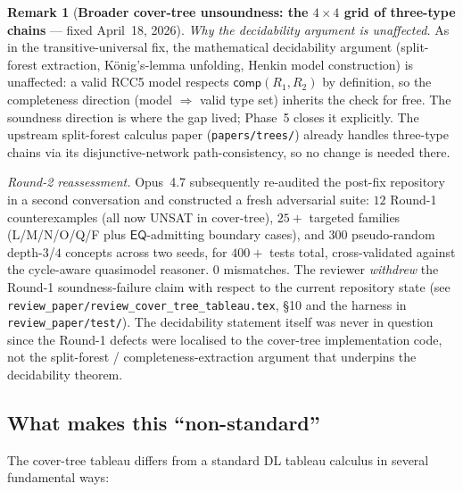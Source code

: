 \documentclass[
]{ceurart}
\theoremstyle{definition}
\newtheorem{remark}[theorem]{Remark}
\newcommand{\EQ}{\ensuremath{\mathsf{EQ}}}
\newcommand{\comp}{\ensuremath{\mathsf{comp}}}
\begin{document}
\begin{remark}[\textbf{Broader cover-tree unsoundness: the $4\times 4$ grid of three-type chains} --- fixed April~18, 2026]
\emph{Why the decidability argument is unaffected.} As in the
transitive-universal fix, the mathematical decidability argument
(split-forest extraction, König's-lemma unfolding, Henkin model
construction) is unaffected: a valid RCC5 model respects
$\comp(R_1, R_2)$ by definition, so the completeness direction
(model $\Rightarrow$ valid type set) inherits the check for free.
The soundness direction is where the gap lived; Phase~5 closes
it explicitly. The upstream split-forest calculus paper
(\texttt{papers/trees/}) already handles three-type chains via
its disjunctive-network path-consistency, so no change is needed
there.

\emph{Round-2 reassessment.} Opus~4.7 subsequently re-audited
the post-fix repository in a second conversation and constructed
a fresh adversarial suite: $12$ Round-1 counterexamples (all now
UNSAT in cover-tree), $25+$ targeted families (L/M/N/O/Q/F plus
$\EQ$-admitting boundary cases), and $300$ pseudo-random
depth-$3$/$4$ concepts across two seeds, for $400+$ tests total,
cross-validated against the cycle-aware quasimodel reasoner.
$0$ mismatches. The reviewer \emph{withdrew} the Round-1
soundness-failure claim with respect to the current repository
state (see \texttt{review\_paper/review\_cover\_tree\_tableau.tex},
§10 and the harness in \texttt{review\_paper/test/}). The
decidability statement itself was never in question since the
Round-1 defects were localised to the cover-tree implementation
code, not the split-forest / completeness-extraction argument that
underpins the decidability theorem.
\end{remark}

\subsection{What makes this ``non-standard''}

The cover-tree tableau differs from a standard DL tableau
calculus in several fundamental ways:
\end{document}
